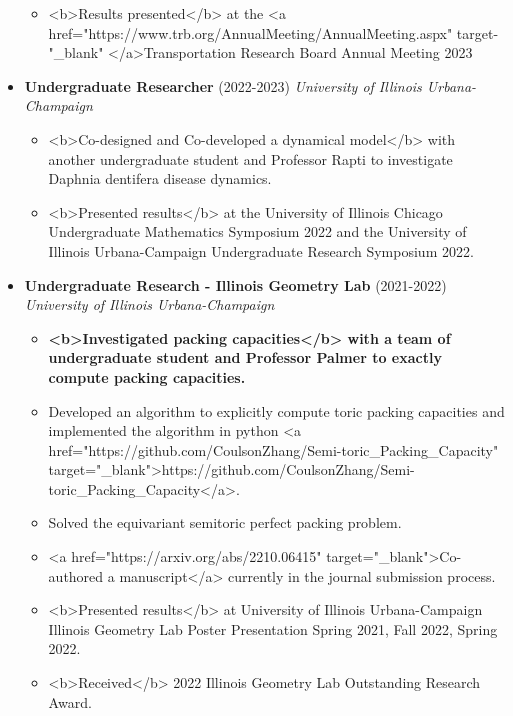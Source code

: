 \begin{itemize}
\begin{itemize}
      \item <b>Results presented</b> at the <a href="https://www.trb.org/AnnualMeeting/AnnualMeeting.aspx" target-"_blank" </a>Transportation Research Board Annual Meeting 2023
    \end{itemize}
  \item \textbf{Undergraduate Researcher} (2022-2023)
    \textit{University of Illinois Urbana-Champaign}
    \begin{itemize}
      \item <b>Co-designed and Co-developed a dynamical model</b> with another undergraduate student and Professor Rapti to investigate Daphnia dentifera disease dynamics.
      \item <b>Presented results</b> at the University of Illinois Chicago Undergraduate Mathematics Symposium 2022 and the University of Illinois Urbana-Campaign Undergraduate Research Symposium 2022.
    \end{itemize}
  \item \textbf{Undergraduate Research - Illinois Geometry Lab} (2021-2022)
    \textit{University of Illinois Urbana-Champaign}
    \begin{itemize}
      \item \textbf{<b>Investigated packing capacities</b> with a team of undergraduate student and Professor Palmer to exactly compute packing capacities.}
        \item Developed an algorithm to explicitly compute toric packing capacities and implemented the algorithm in python <a href="https://github.com/CoulsonZhang/Semi-toric_Packing_Capacity" target="_blank">https://github.com/CoulsonZhang/Semi-toric_Packing_Capacity</a>.
        \item Solved the equivariant semitoric perfect packing problem.
      \item <a href="https://arxiv.org/abs/2210.06415" target="_blank">Co-authored a manuscript</a> currently in the journal submission process.
      \item <b>Presented results</b> at University of Illinois Urbana-Campaign Illinois Geometry Lab Poster Presentation Spring 2021, Fall 2022, Spring 2022.
      \item <b>Received</b> 2022 Illinois Geometry Lab Outstanding Research Award.
    \end{itemize}
\end{itemize}
